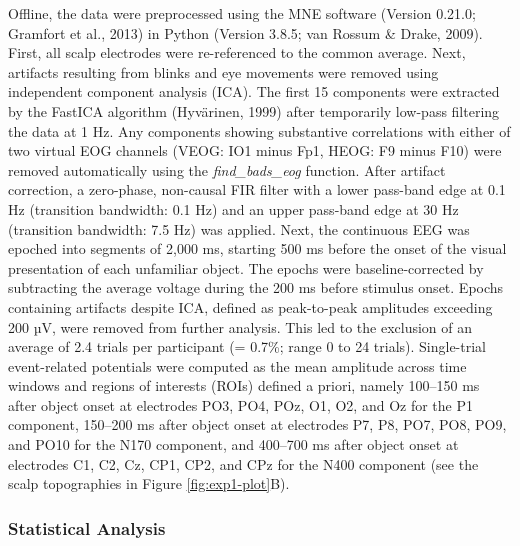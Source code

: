 \documentclass[
  english,
  doc,12pt,twoside,floatsintext]{apa7}
\begin{document}
Offline, the data were preprocessed using the MNE software (Version 0.21.0; Gramfort et al., 2013) in Python (Version 3.8.5; van Rossum \& Drake, 2009). First, all scalp electrodes were re-referenced to the common average. Next, artifacts resulting from blinks and eye movements were removed using independent component analysis (ICA). The first 15 components were extracted by the FastICA algorithm (Hyvärinen, 1999) after temporarily low-pass filtering the data at 1 Hz. Any components showing substantive correlations with either of two virtual EOG channels (VEOG: IO1 minus Fp1, HEOG: F9 minus F10) were removed automatically using the \emph{find\_bads\_eog} function. After artifact correction, a zero-phase, non-causal FIR filter with a lower pass-band edge at 0.1 Hz (transition bandwidth: 0.1 Hz) and an upper pass-band edge at 30 Hz (transition bandwidth: 7.5 Hz) was applied. Next, the continuous EEG was epoched into segments of 2,000 ms, starting 500 ms before the onset of the visual presentation of each unfamiliar object. The epochs were baseline-corrected by subtracting the average voltage during the 200 ms before stimulus onset. Epochs containing artifacts despite ICA, defined as peak-to-peak amplitudes exceeding 200 µV, were removed from further analysis. This led to the exclusion of an average of 2.4 trials per participant (= 0.7\%; range 0 to 24 trials). Single-trial event-related potentials were computed as the mean amplitude across time windows and regions of interests (ROIs) defined a priori, namely 100--150 ms after object onset at electrodes PO3, PO4, POz, O1, O2, and Oz for the P1 component, 150--200 ms after object onset at electrodes P7, P8, PO7, PO8, PO9, and PO10 for the N170 component, and 400--700 ms after object onset at electrodes C1, C2, Cz, CP1, CP2, and CPz for the N400 component (see the scalp topographies in Figure \ref{fig:exp1-plot}B).

\hypertarget{statistical-analysis}{%
\subsubsection{Statistical Analysis}\label{statistical-analysis}}
\end{document}
